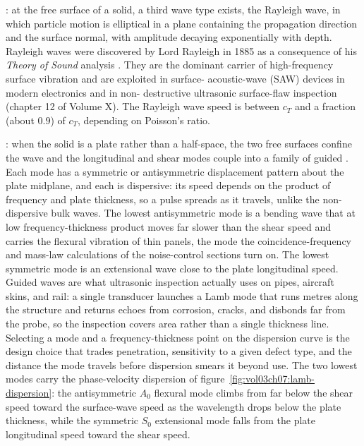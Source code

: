 : at the free surface of a solid,
a third wave type exists, the Rayleigh wave, in which particle
motion is elliptical in a plane containing the propagation direction
and the surface normal, with amplitude decaying exponentially with
depth. Rayleigh waves were discovered by Lord Rayleigh in 1885 as a
consequence of his \emph{Theory of Sound} analysis
\cite{hist:rayleigh1877}. They are the dominant carrier of
high-frequency surface vibration and are exploited in surface-
acoustic-wave (SAW) devices in modern electronics and in non-
destructive ultrasonic surface-flaw inspection (chapter 12 of Volume
X). The Rayleigh wave speed is between $c_T$ and a fraction (about
$0.9$) of $c_T$, depending on Poisson's ratio.

: when the solid is a plate rather than a
half-space, the two free surfaces confine the wave and the longitudinal and
shear modes couple into a family of guided . Each mode
has a symmetric or antisymmetric displacement pattern about the plate
midplane, and each is dispersive: its speed depends on the product of
frequency and plate thickness, so a pulse spreads as it travels, unlike the
non-dispersive bulk waves. The lowest antisymmetric mode is a bending wave
that at low frequency-thickness product moves far slower than the shear
speed and carries the flexural vibration of thin panels, the mode the
coincidence-frequency and mass-law calculations of the noise-control
sections turn on. The lowest symmetric mode is an extensional wave close to
the plate longitudinal speed. Guided waves are what ultrasonic inspection
actually uses on pipes, aircraft skins, and rail: a single transducer
launches a Lamb mode that runs metres along the structure and returns
echoes from corrosion, cracks, and disbonds far from the probe, so the
inspection covers area rather than a single thickness line. Selecting a mode
and a frequency-thickness point on the dispersion curve is the design choice
that trades penetration, sensitivity to a given defect type, and the
distance the mode travels before dispersion smears it beyond use. The two
lowest modes carry the phase-velocity dispersion of
figure~\ref{fig:vol03ch07:lamb-dispersion}: the antisymmetric $A_0$
flexural mode climbs from far below the shear speed toward the surface-wave
speed as the wavelength drops below the plate thickness, while the
symmetric $S_0$ extensional mode falls from the plate longitudinal speed
toward the shear speed.



